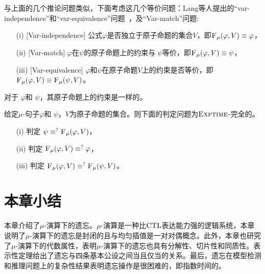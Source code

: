 与上面的几个推论问题类似，下面考虑这几个等价问题：Lang等人提出的“var-independence”和“var-equivalence”问题~\cite{DBLP:journals/jair/LangLM03}，及“Var-match”问题:
\begin{itemize}
	\item[(i)] $[$Var-independence$]$ 公式$\varphi$是否独立于原子命题的集合$V$，即${\textsc{F}_{\textsc{$\mu$}}}(\varphi,V) \equiv \varphi$，
	\item[(ii)] $[$Var-match$]$  $\varphi$在$\psi$的原子命题上的约束与 $\psi$等价，即${\textsc{F}_{\textsc{$\mu$}}}(\varphi, V) \equiv \psi$，
	\item[(iii)] $[$Var-equivalence$]$  $\varphi$和$\psi$在原子命题$V$上的约束是否等价，即${\textsc{F}_{\textsc{$\mu$}}}(\varphi, V) \equiv {\textsc{F}_{\textsc{$\mu$}}}(\psi, V)$。
\end{itemize}
对于 $\varphi$和 $\psi$，其原子命题上的约束是一样的。

\begin{corollary}\label{chapter06:cor:equiv}
	给定$\mu$-句子$\varphi$和 $\psi$，$V$为原子命题的集合。则下面的判定问题为$\textsc{Exptime}$-完全的。
	\begin{itemize}
		\item[(i)] 判定 $\psi \equiv^?{\textsc{F}_{\textsc{$\mu$}}}(\varphi, V)$，
		\item[(ii)] 判定 ${\textsc{F}_{\textsc{$\mu$}}}(\varphi, V) \equiv^? \varphi$，
		\item[(iii)] 判定 ${\textsc{F}_{\textsc{$\mu$}}}(\varphi, V) \equiv^? {\textsc{F}_{\textsc{$\mu$}}}(\psi, V)$。
	\end{itemize}
\end{corollary}
\section{本章小结}\label{sec:chapter06-conclusion}

本章介绍了$\mu$-演算下的遗忘。$\mu$-演算是一种比$\textrm{CTL}$表达能力强的逻辑系统，本章说明了$\mu$-演算下的遗忘是封闭的且与均匀插值是一对对偶概念。此外，本章也研究了$\mu$-演算下的代数属性，表明$\mu$-演算下的遗忘也具有分解性、切片性和同质性。表示性定理给出了遗忘与四条基本公设之间当且仅当的关系。最后，遗忘在模型检测和推理问题上的复杂性结果表明遗忘操作是很困难的，即指数时间的。
